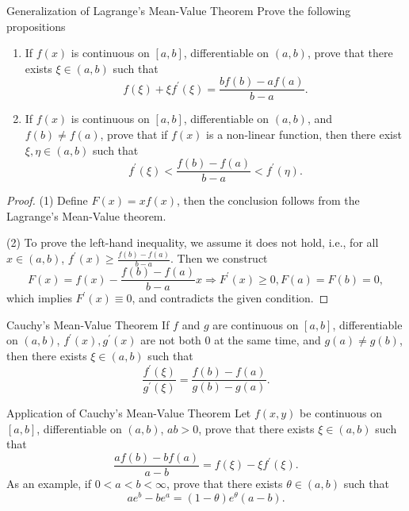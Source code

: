 \begin{example}{Generalization of Lagrange's Mean-Value Theorem}{}
  Prove the following propositions
  \begin{enumerate}
  \item If $f(x)$ is continuous on $[a, b]$, differentiable on $(a, b)$, prove
    that there exists $\xi \in (a, b)$ such that
    \begin{equation}
      f(\xi) + \xi f^{\prime}(\xi) = \frac{b f(b) - a f(a)}{b - a}.
    \end{equation}
  \item If $f(x)$ is continuous on $[a, b]$, differentiable on $(a, b)$, and
    $f(b) \neq f(a)$, prove that if $f(x)$ is a non-linear function, then there exist
    $\xi, \eta \in (a, b)$ such that
    \begin{equation}
      f^{\prime}(\xi) < \frac{f(b) - f(a)}{b - a} < f^{\prime}(\eta).
    \end{equation}
  \end{enumerate}
\end{example}

\begin{proof}
  (1) Define $F(x) = xf(x)$, then the conclusion follows from the Lagrange's
  Mean-Value theorem.

  (2) To prove the left-hand inequality, we assume it does not hold,
  i.e., for all $x \in (a, b)$, $f^{\prime}(x) \geq \frac{f(b) - f(a)}{b - a}$.
  Then we construct
  \begin{equation}
    F(x) = f(x) - \frac{f(b) - f(a)}{b - a} x  \Rightarrow
    F^{\prime}(x) \geq 0, F(a) = F(b) = 0,
  \end{equation}
  which implies $F^{\prime}(x) \equiv 0$,
  and contradicts the given condition.
\end{proof}

\begin{theorem}{Cauchy's Mean-Value Theorem}{}
  If $f$ and $g$ are continuous on $[a, b]$,
  differentiable on $(a, b)$,
  $f^{\prime}(x), g^{\prime}(x)$ are not both $0$ at the same time,
  and $g(a) \neq g(b)$, then there exists $\xi \in (a, b)$ such that
  \begin{equation}
    \frac{f^{\prime}(\xi)}{g^{\prime}(\xi)} = \frac{f(b) - f(a)}{g(b) - g(a)}.
  \end{equation}
\end{theorem}

\begin{example}{Application of Cauchy's Mean-Value Theorem}{}
  Let $f(x, y)$ be continuous on $[a, b]$, differentiable on $(a, b)$, $ab > 0$,
  prove that there exists $\xi \in (a, b)$ such that
  \begin{equation}
    \frac{af(b) - bf(a)}{a - b} = f(\xi) - \xi f^{\prime}(\xi).
  \end{equation}
  As an example, if $0 < a < b < \infty$, prove that there exists $\theta \in
  (a, b)$ such that
  \begin{equation}
    ae^b - be^a = (1 - \theta) e^{\theta}(a-b).
  \end{equation}
\end{example}

